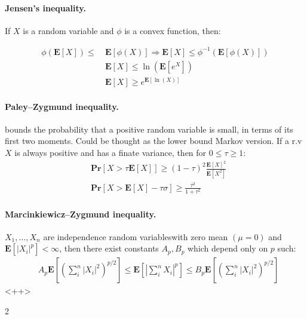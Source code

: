 \documentclass{article}
\newcommand{\prb}[1]{ \mathbf{Pr} \left[ {#1} \right]}
\newcommand{\expp}[1]{ \mathbf{E} \left[ {#1} \right]}
\newcommand{\indpr}{$ X_1, ..., X_n$ are independence random variables}
\begin{document}
\begin{multicols*}{2}
  \paragraph{Jensen's inequality.} If $X$ is a random variable and $\phi$ is a convex function, then:

  \begin{equation*}
    \begin{split}
       \phi\left( \expp{X} \right) \le \ & \expp{\phi\left( X \right)} \Rightarrow   \expp{X} \le \phi^{-1} \left( \expp{\phi\left( X \right)} \right) \\
      & \expp{X} \le \ln\left(\expp{e^{X}}  \right)  \\ 
      &  \expp{X} \ge e^{\expp{\ln \left( X \right)}}  
    \end{split}
  \end{equation*}
  \paragraph{Paley–Zygmund inequality.} bounds the probability that a positive random variable is small, in terms of its first two moments. Could be thought as the lower bound Markov version. If a r.v $X$ is always positive and has a finate variance, then for $0 \le \tau \ge 1$:  
  \begin{equation*}
    \begin{split}
     & \prb{ X > \tau \expp{X} } \ge \left( 1 - \tau \right)^{2}\frac{\expp{X}^{2}}{\expp{X^2}}\\
     &  \prb{ X > \expp{X} - \tau \sigma } \ge \frac{\tau^{2}}{1+\tau^{2}} 
    \end{split}
  \end{equation*}
  \paragraph{Marcinkiewicz–Zygmund inequality.} \indpr with zero mean $\left( \mu = 0  \right)$ and $\expp{|X_{i}|^{p}} < \infty$, then there exist constants $A_{p}, B_{p}$ which depend only on $p$ such:  
  \begin{equation*}
    \begin{split}
      & A_{p}\expp{\left( \sum_{i}^{n}{|X_{i}|^{2}} \right)^{p/2}  } \le \expp{|\sum_{i}^{n}{X_{i}}|^{p} }\le B_{p}\expp{\left( \sum_{i}^{n}{|X_{i}|^{2}} \right)^{p/2}  }        
    \end{split}
  \end{equation*}<++>
\end{multicols*}{2}
\end{document}
